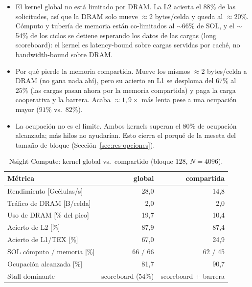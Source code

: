 \documentclass[
	spanish,
	letterpaper, oneside
]{article}
\begin{document}
\begin{itemize}
	\item El kernel global no está limitado por DRAM. La L2 acierta el
	      $88\%$ de las solicitudes, así que la DRAM solo mueve $\approx2$ bytes/celda
	      y queda al $\approx20\%$. Cómputo y tubería de memoria están co-limitados al
	      $\sim$66\% de SOL, y el $\sim$54\% de los ciclos se detiene esperando los
	      datos de las cargas (long scoreboard): el kernel es
	      latency-bound sobre cargas servidas por caché, no
	      bandwidth-bound sobre DRAM.
	\item Por qué pierde la memoria compartida. Mueve los mismos $\approx2$
	      bytes/celda a DRAM (no gana nada ahí), pero su acierto en L1 se desploma del
	      $67\%$ al $25\%$ (las cargas pasan ahora por la memoria compartida) y paga la
	      carga cooperativa y la barrera. Acaba $\approx1{,}9\times$ más lenta
	      pese a una ocupación mayor ($91\%$ vs.\ $82\%$).
	\item La ocupación no es el límite. Ambos kernels superan el $80\%$ de
	      ocupación alcanzada; más hilos no ayudarían. Esto cierra el porqué de la
	      meseta del tamaño de bloque (Sección~\ref{sec:res-opciones}).
\end{itemize}

\begin{table}[H]
	\centering
	\caption{Nsight Compute: kernel global vs.\ compartido (bloque 128, $N=4096$).}
	\label{tab:ncu}
	\begin{tabular}{@{}lrr@{}}
		\toprule
		Métrica & global & compartida \\
		\midrule
		Rendimiento [Gcélulas/s]        & 28{,}0  & 14{,}8 \\
		Tráfico de DRAM [B/celda]       & 2{,}0   & 2{,}0  \\
		Uso de DRAM [\% del pico]       & 19{,}7  & 10{,}4 \\
		Acierto de L2 [\%]              & 87{,}9  & 87{,}4 \\
		Acierto de L1/TEX [\%]          & 67{,}0  & 24{,}9 \\
		SOL cómputo / memoria [\%]      & 66 / 66 & 62 / 45 \\
		Ocupación alcanzada [\%]        & 81{,}7  & 90{,}7 \\
		Stall dominante          & scoreboard ($54\%$) & scoreboard + barrera \\
		\bottomrule
	\end{tabular}
\end{table}
\end{document}
